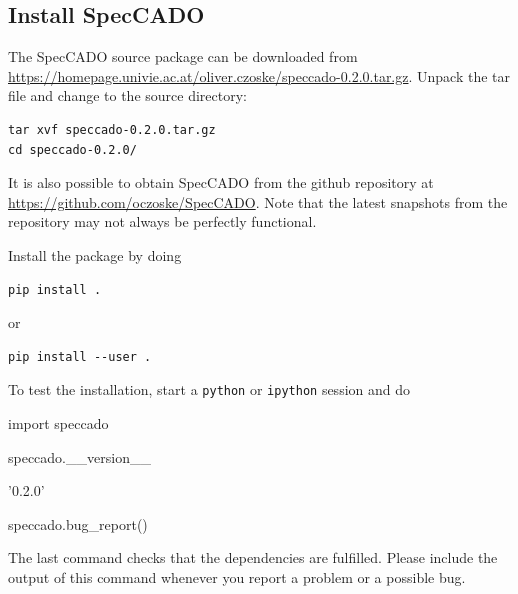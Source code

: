 \documentclass[a4paper,twoside,11pt]{article}
\begin{document}
\subsection{Install SpecCADO}
\label{ssec:install_speccado}

The SpecCADO source package can be downloaded from
\url{https://homepage.univie.ac.at/oliver.czoske/speccado-0.2.0.tar.gz}. Unpack
the tar file and change to the source directory:
\begin{lstlisting}[style=csh]
tar xvf speccado-0.2.0.tar.gz
cd speccado-0.2.0/
\end{lstlisting}
It is also possible to obtain SpecCADO from the github repository at
\url{https://github.com/oczoske/SpecCADO}. Note that the latest
snapshots from the repository may not always be perfectly functional.

Install the package by doing
\begin{lstlisting}[style=csh]
pip install .
\end{lstlisting}
or
\begin{lstlisting}[style=csh]
pip install --user .
\end{lstlisting}

To test the installation, start a \lstinline{python} or
\lstinline{ipython} session and do
\begin{pyin}
  import speccado
\end{pyin}

\begin{pyin}
speccado.__version__
\end{pyin}
\begin{pyout}
'0.2.0'
\end{pyout}
\begin{pyin}
speccado.bug_report()
\end{pyin}

The last command checks that the dependencies are fulfilled. Please
include the output of this command whenever you report a problem or a
possible bug.
\end{document}
